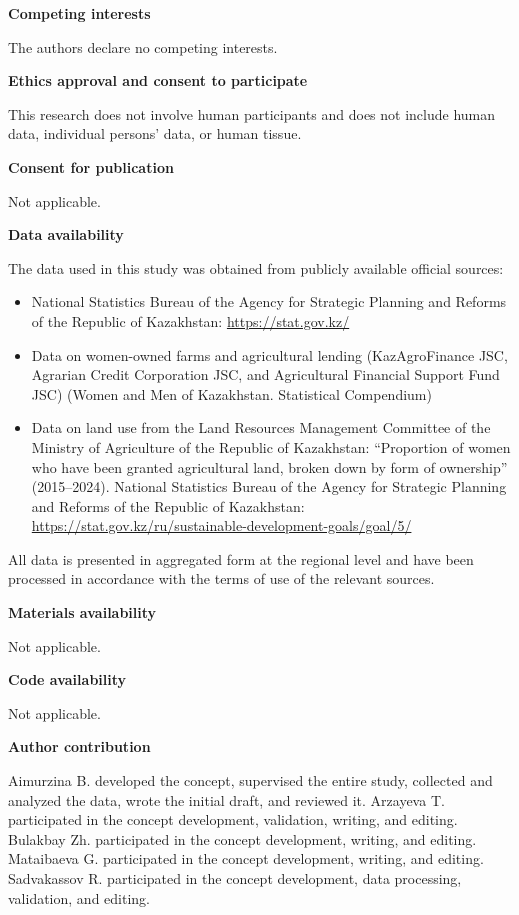 ﻿\documentclass[pdflatex,sn-mathphys-ay]{sn-jnl}
\begin{document}
\medskip
\noindent\textbf{Competing interests}

The authors declare no competing interests.

\medskip
\noindent\textbf{Ethics approval and consent to participate}

This research does not involve human participants and does not include
human data, individual persons' data, or human tissue.

\medskip
\noindent\textbf{Consent for publication}

Not applicable.

\medskip
\noindent\textbf{Data availability}

The data used in this study was obtained from publicly available
official sources:

\begin{itemize}
\item National Statistics Bureau of the Agency for Strategic Planning
and Reforms of the Republic of Kazakhstan: \url{https://stat.gov.kz/}
\item Data on women-owned farms and agricultural lending
(KazAgroFinance JSC, Agrarian Credit Corporation JSC, and Agricultural
Financial Support Fund JSC) (Women and Men of Kazakhstan. Statistical
Compendium)
\item Data on land use from the Land Resources Management Committee of
the Ministry of Agriculture of the Republic of Kazakhstan: ``Proportion
of women who have been granted agricultural land, broken down by form of
ownership'' (2015--2024). National Statistics Bureau of the Agency for
Strategic Planning and Reforms of the Republic of Kazakhstan:
\url{https://stat.gov.kz/ru/sustainable-development-goals/goal/5/}
\end{itemize}

All data is presented in aggregated form at the regional level and have
been processed in accordance with the terms of use of the relevant
sources.

\medskip
\noindent\textbf{Materials availability}

Not applicable.

\medskip
\noindent\textbf{Code availability}

Not applicable.

\medskip
\noindent\textbf{Author contribution}

Aimurzina B. developed the concept, supervised the entire study,
collected and analyzed the data, wrote the initial draft, and reviewed
it. Arzayeva T. participated in the concept development, validation,
writing, and editing. Bulakbay Zh. participated in the concept
development, writing, and editing. Mataibaeva G. participated in the
concept development, writing, and editing. Sadvakassov R. participated
in the concept development, data processing, validation, and editing.


\end{document}
